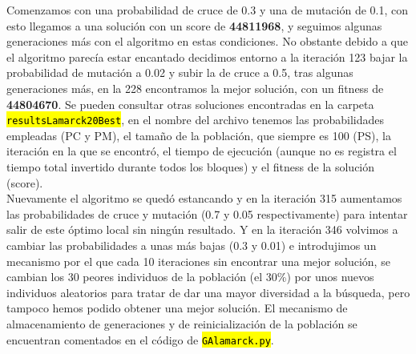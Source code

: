 \documentclass[10pt,a4paper]{article}
\newcommand{\archive}[1]{\sethlcolor{light-green}\hl{\texttt{#1}}} %
\begin{document}
Comenzamos con una probabilidad de cruce de 0.3 y una de mutación de 0.1, con esto llegamos a una solución con un score de \textbf{44811968}, y seguimos algunas generaciones más con el algoritmo en estas condiciones. No obstante debido a que el algoritmo parecía estar encantado decidimos entorno a la iteración 123 bajar la probabilidad de mutación a 0.02 y subir la de cruce a 0.5, tras algunas generaciones más, en la 228 encontramos la mejor solución, con un fitness de \textbf{44804670}. Se pueden consultar otras soluciones encontradas en la carpeta \archive{resultsLamarck20Best}, en el nombre del archivo tenemos las probabilidades empleadas (PC y PM), el tamaño de la población, que siempre es 100 (PS), la iteración en la que se encontró, el tiempo de ejecución (aunque no es registra el tiempo total invertido durante todos los bloques) y el fitness de la solución (score).\\

Nuevamente el algoritmo se quedó estancando y en la iteración 315 aumentamos las probabilidades de cruce y mutación (0.7 y 0.05 respectivamente) para intentar salir de este óptimo local sin ningún resultado. Y en la iteración 346 volvimos a cambiar las probabilidades a unas más bajas (0.3 y 0.01) e introdujimos un mecanismo por el que cada 10 iteraciones sin encontrar una mejor solución, se cambian los 30 peores individuos de la población (el 30\%) por unos nuevos individuos aleatorios para tratar de dar una mayor diversidad a la búsqueda, pero tampoco hemos podido obtener una mejor solución. El mecanismo de almacenamiento de generaciones y de reinicialización de la población se encuentran comentados en el código de \archive{GAlamarck.py}.
\end{document}
